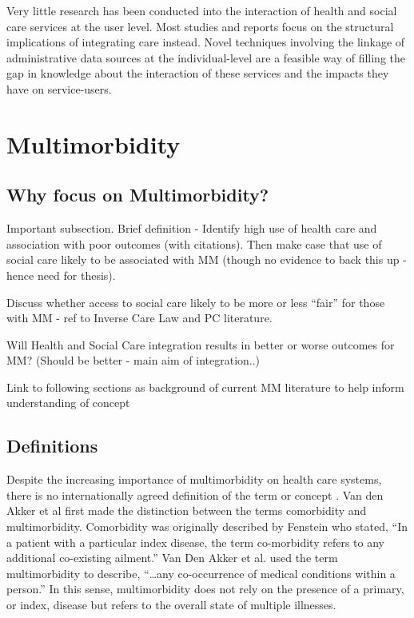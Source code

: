 \documentclass[12pt,]{report}
\begin{document}
Very little research has been conducted into the interaction of health
and social care services at the user level. Most studies and reports
focus on the structural implications of integrating care instead. Novel
techniques involving the linkage of administrative data sources at the
individual-level are a feasible way of filling the gap in knowledge
about the interaction of these services and the impacts they have on
service-users.

\section{Multimorbidity}\label{sec:mm}

\subsection{Why focus on Multimorbidity?}\label{subsec:why-mm}

Important subsection. Brief definition - Identify high use of health
care and association with poor outcomes (with citations). Then make case
that use of social care likely to be associated with MM (though no
evidence to back this up - hence need for thesis).

Discuss whether access to social care likely to be more or less ``fair''
for those with MM - ref to Inverse Care Law and PC literature.

Will Health and Social Care integration results in better or worse
outcomes for MM? (Should be better - main aim of integration..)

Link to following sections as background of current MM literature to
help inform understanding of concept

\subsection{Definitions}\label{subsec:mm-defs}

Despite the increasing importance of multimorbidity on health care
systems, there is no internationally agreed definition of the term or
concept \citep{RN89, RN95}. Van den Akker et al \citeyearpar{RN19} first
made the distinction between the terms comorbidity and multimorbidity.
Comorbidity was originally described by Fenstein \citep[pp.467]{RN338}
who stated, ``In a patient with a particular index disease, the term
co-morbidity refers to any additional co-existing ailment.'' Van Den
Akker et al. \citeyearpar[pp.65]{RN19} used the term multimorbidity to
describe, ``\ldots{}any co-occurrence of medical conditions within a
person.'' In this sense, multimorbidity does not rely on the presence of
a primary, or index, disease but refers to the overall state of multiple
illnesses.
\end{document}
